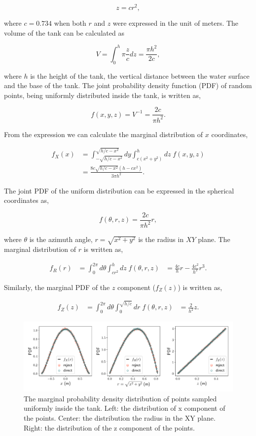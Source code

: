 \documentclass[11pt,twoside]{report}
\begin{document}
$$
z = c r^2,
$$

\noindent where $c=0.734$ when both $r$ and $z$ were expressed in the unit of meters. The volume of the tank can be calculated as

$$
V = \int_{0}^{h}{\pi \frac{z}{c}} dz = \frac{\pi h^2}{2 c},
$$

\noindent where $h$ is the height of the tank, the vertical distance between the water surface and the base of the tank. The joint probability density function (PDF) of random points, being uniformly distributed inside the tank, is written as,

$$
f(x, y, z) = V^{-1} = \frac{2c}{\pi h^2}.
$$

\noindent From the expression we can calculate the marginal distribution of $x$ coordinates,

$$
\begin{aligned}
f_X(x) &= \int_{-\sqrt{h/c - x^2}}^{\sqrt{h/c - x^2}} dy
\int_{c(x^2 + y^2)}^{h} dz \; f(x, y, z) \\[1em]
&= \frac{8 c \sqrt{h/c-x^2} \left(h - c x^2 \right)}{3 \pi h^2}.
\end{aligned}
$$

\noindent The joint PDF of the uniform distribution can be expressed in the spherical coordinates as,

$$
f(\theta, r, z) = \frac{2c}{\pi h^2} r,
$$

\noindent where $\theta$ is the azimuth angle, $r = \sqrt{x^2 + y^2}$ is the radius in $XY$ plane. The marginal distribution of $r$ is written as,

$$
\begin{aligned}
f_R(r) &= \int_0^{2\pi}{d \theta} \int_{cr^2}^{h}{dz} \; f(\theta, r, z)
&= \frac{4c}{h} r - \frac{4 c^2}{h^2} r^3.
\end{aligned}
$$

\noindent Similarly, the marginal PDF of the $z$ component ($f_Z(z)$) is written as,

$$
\begin{aligned}
f_Z(z) &= \int_0^{2\pi}{d \theta} \int_0^{\sqrt{h/c}}{dr} \; f(\theta, r, z) 
&= \frac{2}{h^2} z.
\end{aligned}
$$

\begin{figure}
  \includegraphics[width=\linewidth]{tank-marginal-dist}
  \caption{The marginal probability density distribution of points sampled uniformly inside the tank. Left: the distribution of x component of the points. Center: the distribution the radius in the XY plane. Right: the distribution of the z component of the points.}
  \label{fig:tank-dist}
\end{figure}
\end{document}
